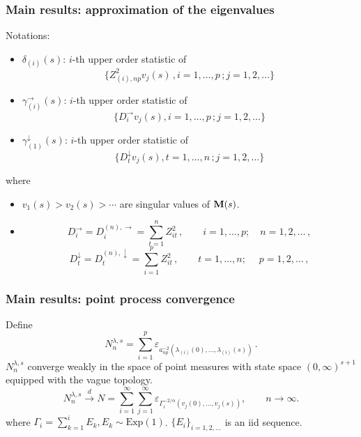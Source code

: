\documentclass{beamer}
\begin{document}
\begin{frame}
  \frametitle{Main results: approximation of the eigenvalues}
  \begin{footnotesize}
    Notations:
    \begin{itemize}
    \item $\delta_{(i)}(s)$: $i$-th upper order statistic of
      \[
      \big\{Z_{(i),np}^2 v_j(s)\,, i=1,\ldots,p\,;j=1,2,\ldots\big\}
      \]
    \item $\gamma_{(i)}^\rightarrow(s)$: $i$-th upper order statistic
      of
      \[
      \big\{D_{i}^\rightarrow v_j(s), i=1,\ldots,p\,;j=1,2,\ldots\big\}
      \]
    \item $\gamma_{(1)}^\downarrow(s)$: $i$-th upper order statistic
      of
      \[
      \big\{D_{t}^\downarrow v_j(s), t=1,\ldots,n\,;j=1,2,\ldots\big\}
      \]
    \end{itemize}
    where
    \begin{itemize}
    \item $v_1(s) > v_2(s) > \cdots$ are singular values
      of $\mathbf{M}(s)$.
    \item
      \begin{equation*}
        D_i^\rightarrow=D_i^{(n),\rightarrow}=\sum_{t=1}^n Z_{it}^2\,, \qquad
        i=1,\ldots,p;\quad  n=1,2,\ldots\,,
      \end{equation*}
      \begin{equation*}
        D_t^\downarrow=D_t^{(n),\downarrow}= \sum_{i=1}^p
        Z_{it}^2\,,\qquad
        t=1,\ldots,n;\; \quad p=1,2,\ldots\,,
      \end{equation*}
    \end{itemize}
  \end{footnotesize}
\end{frame}

\begin{frame}
  \frametitle{Main results: point process convergence}
  \begin{small}
    \begin{theorem}
      Define
      \begin{equation*}
        N_n^{\lambda,s}=\sum_{i=1}^p \varepsilon_{a_{np}^{-2}(\lambda_{(i)}(0),\ldots,\lambda_{(i)}(s))} \,.
      \end{equation*}
      $N_n^{\lambda,s}$ converge weakly in the space of point measures
      with state space $(0,\infty)^{s+1}$ equipped with the vague topology.
      \begin{equation*}
        N_n^{\lambda,s} \overset{d}{\to} N= \sum_{i=1}^\infty
        \sum_{j=1}^{\infty} \varepsilon_{\Gamma_i^{-2/\alpha}
          (v_j(0),\ldots,v_j(s))}, \qquad n \to \infty.
      \end{equation*}
      where $\Gamma_i = \sum_{k=1}^i E_k, E_k \sim
      \text{Exp}(1)$. $\{E_i\}_{i=1,2,\dots}$ is an iid sequence. 
    \end{theorem}
  \end{small}
\end{frame}
\end{document}
